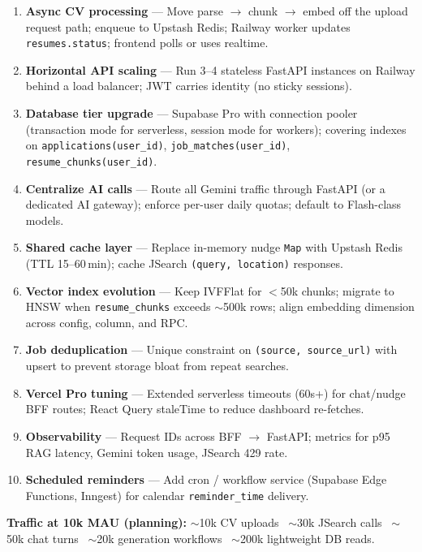 \documentclass[11pt,a4paper]{article}
\begin{document}
\begin{enumerate}[leftmargin=*, itemsep=3pt]
  \item \textbf{Async CV processing} --- Move parse $\rightarrow$ chunk $\rightarrow$ embed off the upload request path; enqueue to Upstash Redis; Railway worker updates \texttt{resumes.status}; frontend polls or uses realtime.
  \item \textbf{Horizontal API scaling} --- Run 3--4 stateless FastAPI instances on Railway behind a load balancer; JWT carries identity (no sticky sessions).
  \item \textbf{Database tier upgrade} --- Supabase Pro with connection pooler (transaction mode for serverless, session mode for workers); covering indexes on \texttt{applications(user\_id)}, \texttt{job\_matches(user\_id)}, \texttt{resume\_chunks(user\_id)}.
  \item \textbf{Centralize AI calls} --- Route all Gemini traffic through FastAPI (or a dedicated AI gateway); enforce per-user daily quotas; default to Flash-class models.
  \item \textbf{Shared cache layer} --- Replace in-memory nudge \texttt{Map} with Upstash Redis (TTL 15--60\,min); cache JSearch \texttt{(query, location)} responses.
  \item \textbf{Vector index evolution} --- Keep IVFFlat for $<$50k chunks; migrate to HNSW when \texttt{resume\_chunks} exceeds ${\sim}$500k rows; align embedding dimension across config, column, and RPC.
  \item \textbf{Job deduplication} --- Unique constraint on \texttt{(source, source\_url)} with upsert to prevent storage bloat from repeat searches.
  \item \textbf{Vercel Pro tuning} --- Extended serverless timeouts (60s+) for chat/nudge BFF routes; React Query staleTime to reduce dashboard re-fetches.
  \item \textbf{Observability} --- Request IDs across BFF $\rightarrow$ FastAPI; metrics for p95 RAG latency, Gemini token usage, JSearch 429 rate.
  \item \textbf{Scheduled reminders} --- Add cron / workflow service (Supabase Edge Functions, Inngest) for calendar \texttt{reminder\_time} delivery.
\end{enumerate}

\vspace{0.5em}
\noindent
{\footnotesize
\textbf{Traffic at 10k MAU (planning):}
${\sim}$10k CV uploads \textbullet\ ${\sim}$30k JSearch calls \textbullet\
${\sim}$50k chat turns \textbullet\ ${\sim}$20k generation workflows \textbullet\
${\sim}$200k lightweight DB reads.
}
\end{document}
